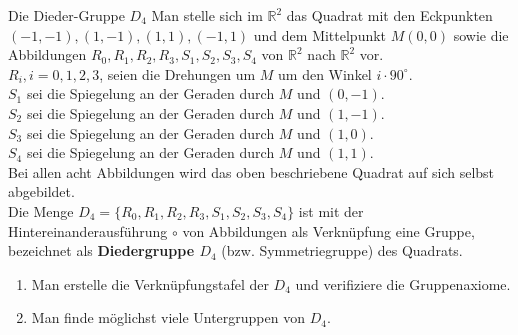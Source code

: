 \documentclass{uebblatt}
\begin{document}

\begin{aufgabe}{Die Dieder-Gruppe $D_4$}
Man stelle sich im $\mathbb{R}^2$ das Quadrat mit den Eckpunkten $(-1, -1), (1, -1), (1, 1), (-1,1)$ und dem Mittelpunkt $M (0, 0)$ sowie die Abbildungen $R_0, R_1, R_2, R_3, S_1, S_2, S_3, S_4$ von $\mathbb{R}^2$ nach $\mathbb{R}^2$ vor.\\
$R_i, i = 0, 1, 2, 3$, seien die Drehungen um $M$ um den Winkel $i \cdot 90^\circ$.\\
$S_1$ sei die Spiegelung an der Geraden durch $M$ und $(0, -1)$.\\
$S_2$ sei die Spiegelung an der Geraden durch $M$ und $(1, -1)$.\\
$S_3$ sei die Spiegelung an der Geraden durch $M$ und $(1, 0)$.\\
$S_4$ sei die Spiegelung an der Geraden durch $M$ und $(1, 1)$.\\
Bei allen acht Abbildungen wird das oben beschriebene Quadrat auf sich selbst abgebildet.\\
Die Menge $D_4 = \{R_0, R_1, R_2, R_3, S_1, S_2, S_3, S_4\}$ ist mit der Hintereinanderausführung $\circ$ von Abbildungen als Verknüpfung eine Gruppe, bezeichnet als \textbf{Diedergruppe $D_4$} (bzw. Symmetriegruppe) des Quadrats.
\begin{enumerate}
\item Man erstelle die Verknüpfungstafel der $D_4$ und verifiziere die Gruppenaxiome.
\item Man finde möglichst viele Untergruppen von $D_4$. \\
\end{enumerate}

\end{aufgabe}
\end{document}
